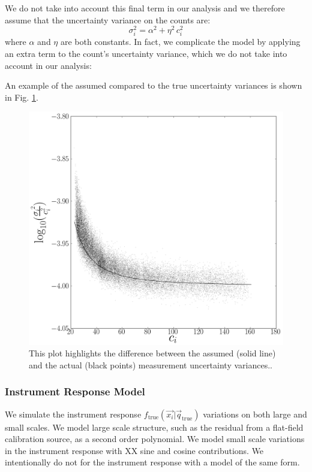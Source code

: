 \documentclass[manuscript]{aastex}
\newcommand{\true}{\mathrm{true}}
\begin{document}
We do not take into account this final term in our analysis and we therefore assume that the uncertainty variance on the counts are:
\begin{displaymath}
\sigma_{{i}}^{2} = \alpha^{2} + \eta^{2}\, c^{2}_i
\end{displaymath}
\noindent{}where $\alpha$ and $\eta$ are both constants. In fact, we complicate the model by applying an extra term to the count's uncertainty variance, which we do not take into account in our analysis: 

An example of the assumed compared to the true uncertainty variances is shown in Fig. \ref{fig:invvar}.

\begin{figure}[ht]
\begin{center}
\includegraphics[width=\textwidth]{invvar.png}
\end{center}
\caption{This plot highlights the difference between the assumed (solid line) and the actual (black points) measurement uncertainty variances.\label{fig:invvar}.}
\end{figure}

\subsubsection{Instrument Response Model}
We simulate the instrument response $f_\true(\vec{x_i} | \vec{q}_{\true})$ variations on both large and small scales. We model large scale structure, such as the residual from a flat-field calibration source, as a second order polynomial. We model small scale variations in the instrument response with XX sine and cosine contributions. We intentionally do not for the instrument response with a model of the same form.
\end{document}
